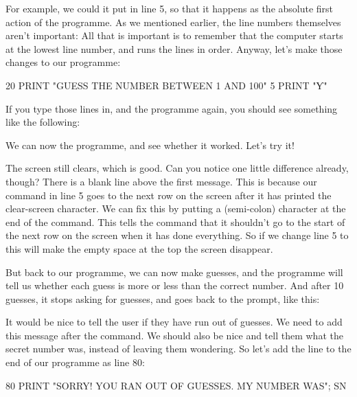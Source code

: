 \needspace{2cm}
For example, we could it put in line 5, so that it happens
as the absolute first action of the programme.  As we mentioned
earlier, the line numbers themselves aren't important: All that is
important is to remember that the computer starts at the lowest line
number, and runs the lines in order.  Anyway, let's make those changes
to our programme:

\begin{screenoutput}
  20 PRINT "GUESS THE NUMBER BETWEEN 1 AND 100"
  5 PRINT "Ƴ"
\end{screenoutput}

\needspace{4cm}
If you type those lines in, and  the programme again, you
should see something like the following:


\needspace{4cm}
We can now  the programme, and see whether it worked. Let's try it!


The screen still clears, which is good.  Can you notice one little
difference already, though?  There is a blank line above the first
message. This is because our  command in line 5 goes to
the next row on the screen after it has printed the clear-screen character.  We can
fix this by putting a \stw{;} (semi-colon) character at the end of the
 command.  This tells the  command that it
shouldn't go to the start of the next row on the screen when it has
done everything.  So if we change line 5 to  this
will make the empty space at the top the screen disappear.

\needspace{4cm}
But back to our programme, we can now make guesses, and the programme
will tell us whether each guess is more or less than the correct
number.  And after 10 guesses, it stops asking for guesses, and goes
back to the  prompt, like this:  


\needspace{2cm}
It would be nice to tell the user if they have run out of
guesses. We need to add this message after the  command.
We should also be nice and tell them what the secret number was,
instead of leaving them wondering.
So let's add the line to the end of our programme as line 80:

\begin{screenoutput}
80 PRINT "SORRY! YOU RAN OUT OF GUESSES. MY NUMBER WAS"; SN
\end{screenoutput}

